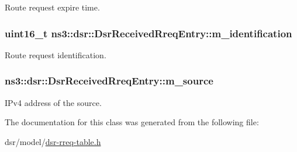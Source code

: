 Route request expire time. 

\subsubsection[{\texorpdfstring{m\+\_\+identification}{m_identification}}]{\setlength{\rightskip}{0pt plus 5cm}uint16\+\_\+t ns3\+::dsr\+::\+Dsr\+Received\+Rreq\+Entry\+::m\+\_\+identification\hspace{0.3cm}{\ttfamily [private]}}\hypertarget{classns3_1_1dsr_1_1DsrReceivedRreqEntry_ab7d5d88cd1b38535da33c6bcc71aa562}{}\label{classns3_1_1dsr_1_1DsrReceivedRreqEntry_ab7d5d88cd1b38535da33c6bcc71aa562}


Route request identification. 

\subsubsection[{\texorpdfstring{m\+\_\+source}{m_source}}]{ ns3\+::dsr\+::\+Dsr\+Received\+Rreq\+Entry\+::m\+\_\+source\hspace{0.3cm}{\ttfamily [private]}}\hypertarget{classns3_1_1dsr_1_1DsrReceivedRreqEntry_a374722e0a90fd8d76dd392e7a0a2398e}{}\label{classns3_1_1dsr_1_1DsrReceivedRreqEntry_a374722e0a90fd8d76dd392e7a0a2398e}


I\+Pv4 address of the source. 



The documentation for this class was generated from the following file\+:\begin{DoxyCompactItemize}
\item 
dsr/model/\hyperlink{dsr-rreq-table_8h}{dsr-\/rreq-\/table.\+h}\end{DoxyCompactItemize}
